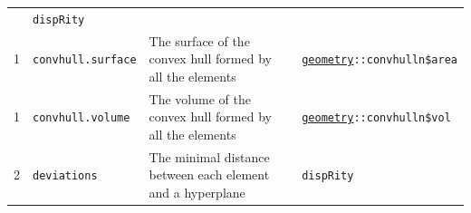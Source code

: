 \documentclass[]{book}
\begin{document}
\begin{longtable}[]{@{}llll@{}}
\begin{minipage}[t]{0.64\columnwidth}
\end{minipage} & \begin{minipage}[t]{0.10\columnwidth}\raggedright
\texttt{dispRity}\strut
\end{minipage}\tabularnewline
\begin{minipage}[t]{0.07\columnwidth}\raggedright
1\strut
\end{minipage} & \begin{minipage}[t]{0.07\columnwidth}\raggedright
\texttt{convhull.surface}\strut
\end{minipage} & \begin{minipage}[t]{0.64\columnwidth}\raggedright
The surface of the convex hull formed by all the elements\strut
\end{minipage} & \begin{minipage}[t]{0.10\columnwidth}\raggedright
\href{https://cran.r-project.org/web/packages/geometry/index.html}{\texttt{geometry}}\texttt{::convhulln\$area}\strut
\end{minipage}\tabularnewline
\begin{minipage}[t]{0.07\columnwidth}\raggedright
1\strut
\end{minipage} & \begin{minipage}[t]{0.07\columnwidth}\raggedright
\texttt{convhull.volume}\strut
\end{minipage} & \begin{minipage}[t]{0.64\columnwidth}\raggedright
The volume of the convex hull formed by all the elements\strut
\end{minipage} & \begin{minipage}[t]{0.10\columnwidth}\raggedright
\href{https://cran.r-project.org/web/packages/geometry/index.html}{\texttt{geometry}}\texttt{::convhulln\$vol}\strut
\end{minipage}\tabularnewline
\begin{minipage}[t]{0.07\columnwidth}\raggedright
2\strut
\end{minipage} & \begin{minipage}[t]{0.07\columnwidth}\raggedright
\texttt{deviations}\strut
\end{minipage} & \begin{minipage}[t]{0.64\columnwidth}\raggedright
The minimal distance between each element and a hyperplane\strut
\end{minipage} & \begin{minipage}[t]{0.10\columnwidth}\raggedright
\texttt{dispRity}\strut
\end{minipage}\tabularnewline

\end{longtable}
\end{document}
